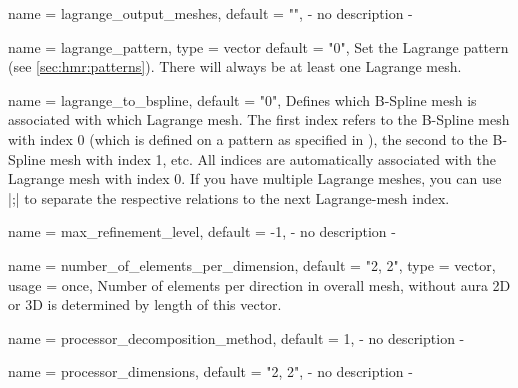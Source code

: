 \begin{parameter}{
    name    = {lagrange_output_meshes},
    default = {""},
}
- no description -
\end{parameter}

\begin{parameter}{
    name    = {lagrange_pattern},
    type    = {vector}
    default = {"0"},
}
Set the Lagrange pattern (see \ref{sec:hmr:patterns}).
There will always be at least one Lagrange mesh.
\end{parameter}

\begin{parameter}{
    name    = {lagrange_to_bspline},
    default = {"0"},
}
Defines which B-Spline mesh is associated with which Lagrange mesh.
The first index refers to the B-Spline mesh with index 0 (which is defined on a pattern as specified in ), the second to the B-Spline mesh with index 1, etc.
All indices are automatically associated with the Lagrange mesh with index 0.
If you have multiple Lagrange meshes, you can use |;| to separate the respective relations to the next Lagrange-mesh index.
\end{parameter}

\begin{parameter}{
    name    = {max_refinement_level},
    default = {-1},
}
- no description -
\end{parameter}

\begin{parameter}{
    name    = {number_of_elements_per_dimension},
    default = {"2, 2"},
    type    = {vector},
    usage   = {once},
}
Number of elements per direction in overall mesh, without aura 2D or 3D is determined by length of this vector.
\end{parameter}

\begin{parameter}{
    name    = {processor_decomposition_method},
    default = {1},
}
- no description -
\end{parameter}

\begin{parameter}{
    name    = {processor_dimensions},
    default = {"2, 2"},
}
- no description -
\end{parameter}


